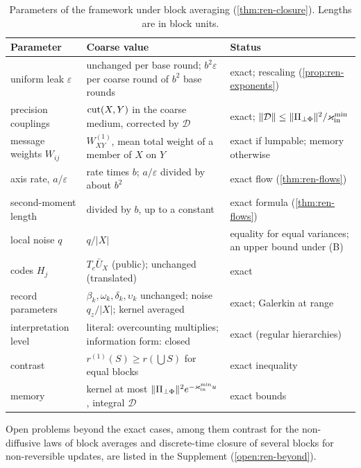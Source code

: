 \begin{table}[t]
\centering
\caption{Parameters of the framework under block averaging (\cref{thm:ren-closure}). Lengths are in block units.}
\label{tab:ren-parameters}
\begin{tabular}{@{}p{}p{}p{}@{}}
\toprule
Parameter & Coarse value & Status\\
\midrule
uniform leak $\varepsilon$ & unchanged per base round; $b^2\varepsilon$ per coarse round of $b^2$ base rounds & exact; rescaling (\cref{prop:ren-exponents})\\
precision couplings & $\operatorname{cut}(X,Y)$ in the coarse medium, corrected by $\mathcal D$ & exact; $\Vert\mathcal D\Vert\le\Vert\Pi_{\perp\Phi}\Vert^2/\varkappa_{\mathrm{in}}^{\min}$\\
message weights $W_{ij}$ & $W^{(1)}_{XY}$, mean total weight of a member of $X$ on $Y$ & exact if lumpable; memory otherwise\\
axis rate, $a/\varepsilon$ & rate times $b$; $a/\varepsilon$ divided by about $b^2$ & exact flow (\cref{thm:ren-flows})\\
second-moment length & divided by $b$, up to a constant & exact formula (\cref{thm:ren-flows})\\
local noise $q$ & $q/\lvert X\rvert$ & equality for equal variances; an upper bound under \textup{(B)}\\
codes $H_j$ & $T_c\bar U_X$ (public); unchanged (translated) & exact\\
record parameters & $\beta_k,\omega_k,\delta_k,\upsilon_k$ unchanged; noise $q_z/\lvert X\rvert$; kernel averaged & exact; Galerkin at range\\
interpretation level & literal: overcounting multiplies; information form: closed & exact (regular hierarchies)\\
contrast & $r^{(1)}(S)\ge r(\bigcup S)$ for equal blocks & exact inequality\\
memory & kernel at most $\Vert\Pi_{\perp\Phi}\Vert^2e^{-\varkappa_{\mathrm{in}}^{\min}u}$, integral $\mathcal D$ & exact bounds\\
\bottomrule
\end{tabular}
\end{table}

Open problems beyond the exact cases, among them contrast for the non-diffusive laws of block averages and discrete-time closure of several blocks for non-reversible updates, are listed in the Supplement (\cref{open:ren-beyond}).

